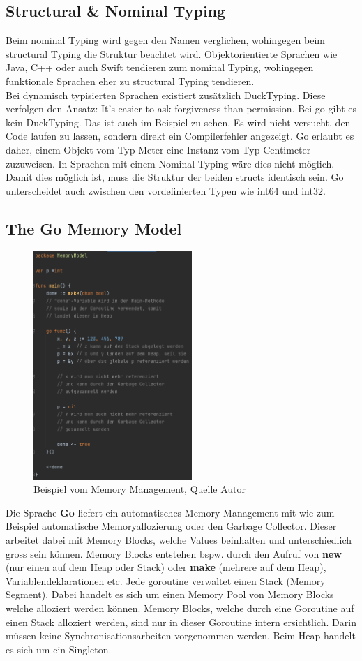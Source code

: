 \documentclass[12pt,titlepage]{article}
\begin{document}
\subsection{Structural \& Nominal Typing}
Beim nominal Typing wird gegen den Namen verglichen, wohingegen beim structural Typing die Struktur beachtet wird. Objektorientierte Sprachen wie Java, C++ oder auch Swift tendieren zum nominal Typing, wohingegen funktionale Sprachen eher zu structural Typing tendieren. \\
Bei dynamisch typisierten Sprachen existiert zusätzlich DuckTyping. Diese verfolgen den Ansatz: It's easier to ask forgiveness than permission. Bei go gibt es kein DuckTyping. Das ist auch im Beispiel zu sehen. Es wird nicht versucht, den Code laufen zu lassen, sondern direkt ein Compilerfehler angezeigt.
Go erlaubt es daher, einem Objekt vom Typ Meter eine Instanz vom Typ Centimeter zuzuweisen. In Sprachen mit einem Nominal Typing wäre dies nicht möglich. Damit dies möglich ist, muss die Struktur der beiden structs identisch sein. Go unterscheidet auch zwischen den vordefinierten Typen wie int64 und int32. 


\subsection{The Go Memory Model}
\begin{figure}
	\centering
	\includegraphics[width=6cm]{memorymodel}
	\caption{Beispiel vom Memory Management, Quelle Autor}\label{memorymodel}
\end{figure}
Die Sprache \textbf{Go} liefert ein automatisches Memory Management mit wie zum Beispiel automatische Memoryallozierung oder den Garbage Collector.
Dieser arbeitet dabei mit Memory Blocks, welche Values beinhalten und unterschiedlich gross sein können.
Memory Blocks entstehen bspw. durch den Aufruf von \textbf{new} (nur einen auf dem Heap oder Stack) oder \textbf{make} (mehrere auf dem Heap), Variablendeklarationen etc.
Jede goroutine verwaltet einen Stack (Memory Segment).
Dabei handelt es sich um einen Memory Pool von Memory Blocks welche alloziert werden können.
Memory Blocks, welche durch eine Goroutine auf einen Stack alloziert werden, sind nur in dieser Goroutine intern ersichtlich.
Darin müssen keine Synchronisationsarbeiten vorgenommen werden.
Beim Heap handelt es sich um ein Singleton.
\end{document}
